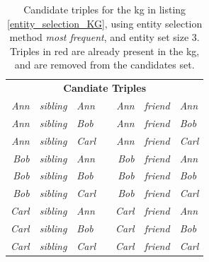 \begin{table}[htbp]
\centering
\begin{tabular}{rcllrcl}
\multicolumn{7}{c}{\textbf{Candiate Triples}}                                                                                                                                                                                                       \\
\textit{Ann}                        & \textit{sibling}                        & \textit{Ann}                        &  & \textit{Ann}                        & \textit{friend}                        & \textit{Ann}                        \\
{\color[HTML]{CB0000} \textit{Ann}} & {\color[HTML]{CB0000} \textit{sibling}} & {\color[HTML]{CB0000} \textit{Bob}}   &  & \textit{Ann}                        & \textit{friend}                        & \textit{Bob}                          \\
{\color[HTML]{CB0000} \textit{Ann}} & {\color[HTML]{CB0000} \textit{sibling}} & {\color[HTML]{CB0000} \textit{Carl}} &  & {\color[HTML]{CB0000} \textit{Ann}} & {\color[HTML]{CB0000} \textit{friend}} & {\color[HTML]{CB0000} \textit{Carl}} \\
\textit{Bob}                          & \textit{sibling}                        & \textit{Ann}                        &  & \textit{Bob}                          & \textit{friend}                        & \textit{Ann}                        \\
\textit{Bob}                          & \textit{sibling}                        & \textit{Bob}                          &  & \textit{Bob}                          & \textit{friend}                        & \textit{Bob}                          \\
\textit{Bob}                          & \textit{sibling}                        & \textit{Carl}                        &  & {\color[HTML]{CB0000} \textit{Bob}}   & {\color[HTML]{CB0000} \textit{friend}} & {\color[HTML]{CB0000} \textit{Carl}} \\
\textit{Carl}                        & \textit{sibling}                        & \textit{Ann}                        &  & \textit{Carl}                        & \textit{friend}                        & \textit{Ann}                        \\
\textit{Carl}                        & \textit{sibling}                        & \textit{Bob}                          &  & \textit{Carl}                        & \textit{friend}                        & \textit{Bob}                          \\
\textit{Carl}                        & \textit{sibling}                        & \textit{Carl}                        &  & \textit{Carl}                        & \textit{friend}                        & \textit{Carl}                       
\end{tabular}
\caption[Candidate triples for example KG]{Candidate triples for the \gls{kg} in listing \ref{entity_selection_KG}, using entity selection method \textit{most frequent}, and entity set size 3. Triples in red are already present in the \gls{kg}, and are removed from the candidates set.}
\label{canidate_triples_most_frequent}
\end{table}
